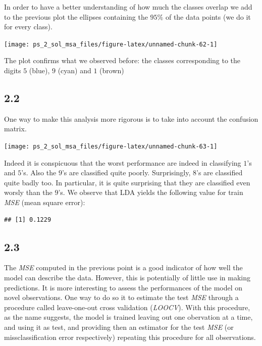 \documentclass[
]{article}
\theoremstyle{plain}
\begin{document}
In order to have a better understanding of how much the classes overlap
we add to the previous plot the ellipses containing the \(95\%\) of the
data points (we do it for every class).

\vspace{-30pt}

\begin{center}\texttt{[image: ps\_2\_sol\_msa\_files/figure-latex/unnamed-chunk-62-1]} \end{center}

The plot confirms what we observed before: the classes corresponding to
the digits \(5\) (blue), \(9\) (cyan) and \(1\) (brown)

\hypertarget{section-6}{%
\subsection{2.2}\label{section-6}}

One way to make this analysis more rigorous is to take into account the
confusion matrix.

\begin{center}\texttt{[image: ps\_2\_sol\_msa\_files/figure-latex/unnamed-chunk-63-1]} \end{center}

Indeed it is conspicuous that the worst performance are indeed in
classifying \(1\)'s and \(5\)'s. Also the \(9\)'s are classified quite
poorly. Surprisingly, \(8\)'s are classified quite badly too. In
particular, it is quite surprising that they are classified even worsly
than the \(9\)'s. We observe that LDA yields the following value for
train \textit{MSE} (mean square error):

\smallskip

\begin{verbatim}
## [1] 0.1229
\end{verbatim}

\hypertarget{section-7}{%
\subsection{2.3}\label{section-7}}

The \textit{MSE} computed in the previous point is a good indicator of
how well the model can describe the data. However, this is potentially
of little use in making predictions. It is more interesting to assess
the performances of the model on novel observations. One way to do so it
to estimate the test \textit{MSE} through a procedure called
leave-one-out cross validation (\textit{LOOCV}). With this procedure, as
the name suggests, the model is trained leaving out one obervation at a
time, and using it as test, and providing then an estimator for the test
\textit{MSE} (or missclassification error respectively) repeating this
procedure for all observations.
\end{document}
